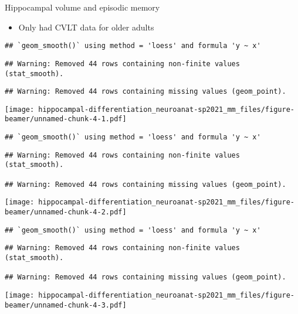 \documentclass[
  ignorenonframetext,
]{beamer}
\providecommand{\tightlist}{%
  \setlength{\itemsep}{0pt}\setlength{\parskip}{0pt}}
\begin{document}
\begin{frame}[fragile]{Hippocampal volume and episodic memory}
\protect\hypertarget{hippocampal-volume-and-episodic-memory}{}
\begin{itemize}
\tightlist
\item
  Only had CVLT data for older adults
\end{itemize}

\begin{verbatim}
## `geom_smooth()` using method = 'loess' and formula 'y ~ x'
\end{verbatim}

\begin{verbatim}
## Warning: Removed 44 rows containing non-finite values (stat_smooth).
\end{verbatim}

\begin{verbatim}
## Warning: Removed 44 rows containing missing values (geom_point).
\end{verbatim}

\texttt{[image: hippocampal-differentiation\_neuroanat-sp2021\_mm\_files/figure-beamer/unnamed-chunk-4-1.pdf]}

\begin{verbatim}
## `geom_smooth()` using method = 'loess' and formula 'y ~ x'
\end{verbatim}

\begin{verbatim}
## Warning: Removed 44 rows containing non-finite values (stat_smooth).

## Warning: Removed 44 rows containing missing values (geom_point).
\end{verbatim}

\texttt{[image: hippocampal-differentiation\_neuroanat-sp2021\_mm\_files/figure-beamer/unnamed-chunk-4-2.pdf]}

\begin{verbatim}
## `geom_smooth()` using method = 'loess' and formula 'y ~ x'
\end{verbatim}

\begin{verbatim}
## Warning: Removed 44 rows containing non-finite values (stat_smooth).

## Warning: Removed 44 rows containing missing values (geom_point).
\end{verbatim}

\texttt{[image: hippocampal-differentiation\_neuroanat-sp2021\_mm\_files/figure-beamer/unnamed-chunk-4-3.pdf]}


\end{frame}
\end{document}
